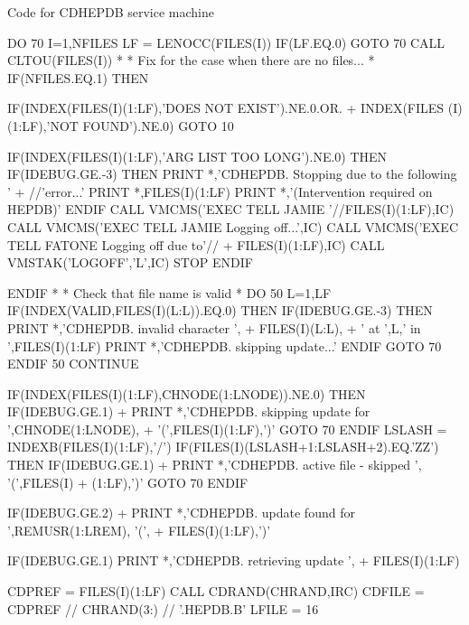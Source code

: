 \begin{XMPt}{Code for CDHEPDB service machine}
 
         DO 70 I=1,NFILES
            LF = LENOCC(FILES(I))
            IF(LF.EQ.0) GOTO 70
            CALL CLTOU(FILES(I))
*
*     Fix for the case when there are no files...
*
            IF(NFILES.EQ.1) THEN
 
               IF(INDEX(FILES(I)(1:LF),'DOES NOT EXIST').NE.0.OR.
     +         INDEX(FILES (I)(1:LF),'NOT FOUND').NE.0) GOTO 10
 
               IF(INDEX(FILES(I)(1:LF),'ARG LIST TOO LONG').NE.0) THEN
                  IF(IDEBUG.GE.-3) THEN
                     PRINT *,'CDHEPDB. Stopping due to the following '
     +               //'error...'
                     PRINT *,FILES(I)(1:LF)
                     PRINT *,'(Intervention required on HEPDB)'
                  ENDIF
                  CALL VMCMS('EXEC TELL JAMIE '//FILES(I)(1:LF),IC)
                  CALL VMCMS('EXEC TELL JAMIE Logging off...',IC)
                  CALL VMCMS('EXEC TELL FATONE Logging off due to'//
     +            FILES(I)(1:LF),IC)
                  CALL VMSTAK('LOGOFF','L',IC)
                  STOP
               ENDIF
 
            ENDIF
*
*     Check that file name is valid
*
            DO 50 L=1,LF
               IF(INDEX(VALID,FILES(I)(L:L)).EQ.0) THEN
                  IF(IDEBUG.GE.-3) THEN
                     PRINT *,'CDHEPDB. invalid character ',
     +                  FILES(I)(L:L),
     +                  ' at ',L,' in ',FILES(I)(1:LF)
                     PRINT *,'CDHEPDB. skipping update...'
                  ENDIF
                  GOTO 70
               ENDIF
   50       CONTINUE
 
            IF(INDEX(FILES(I)(1:LF),CHNODE(1:LNODE)).NE.0) THEN
               IF(IDEBUG.GE.1)
     +         PRINT *,'CDHEPDB. skipping update for ',CHNODE(1:LNODE),
     +         '(',FILES(I)(1:LF),')'
               GOTO 70
            ENDIF
            LSLASH = INDEXB(FILES(I)(1:LF),'/')
            IF(FILES(I)(LSLASH+1:LSLASH+2).EQ.'ZZ') THEN
               IF(IDEBUG.GE.1)
     +         PRINT *,'CDHEPDB. active file - skipped ', '(',FILES(I)
     +         (1:LF),')'
               GOTO 70
            ENDIF
 
            IF(IDEBUG.GE.2)
     +      PRINT *,'CDHEPDB. update found for ',REMUSR(1:LREM), '(',
     +      FILES(I)(1:LF),')'
 
            IF(IDEBUG.GE.1) PRINT *,'CDHEPDB. retrieving update ',
     +      FILES(I)(1:LF)
 
            CDPREF = FILES(I)(1:LF)
            CALL CDRAND(CHRAND,IRC)
            CDFILE = CDPREF // CHRAND(3:) // '.HEPDB.B'
            LFILE  = 16
 

\end{XMPt}
